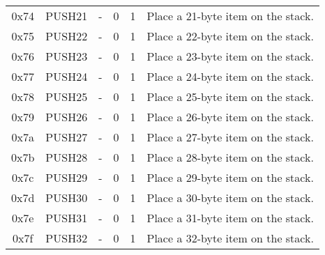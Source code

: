 \documentclass[10pt,letterpaper,leqno,bibliography=totoc]{scrartcl}
\newenvironment{alphafootnotes}
{\par\edef\savedfootnotenumber{\number\value{footnote}}
\renewcommand{\thefootnote}{\alph{footnote}}
\setcounter{footnote}{0}}
{\par\setcounter{footnote}{\savedfootnotenumber}}
\begin{document}
\begin{alphafootnotes}
\begin{longtable}{|cP{2.8cm}cccp{6cm}|}
			0x74 & PUSH21 & - & 0 & 1 & Place a 21-byte item on the stack. \\
			0x75 & PUSH22 & - & 0 & 1 & Place a 22-byte item on the stack. \\
			0x76 & PUSH23 & - & 0 & 1 & Place a 23-byte item on the stack. \\
			0x77 & PUSH24 & - & 0 & 1 & Place a 24-byte item on the stack. \\
			0x78 & PUSH25 & - & 0 & 1 & Place a 25-byte item on the stack. \\
			0x79 & PUSH26 & - & 0 & 1 & Place a 26-byte item on the stack. \\
			0x7a & PUSH27 & - & 0 & 1 & Place a 27-byte item on the stack. \\
			0x7b & PUSH28 & - & 0 & 1 & Place a 28-byte item on the stack. \\
			0x7c & PUSH29 & - & 0 & 1 & Place a 29-byte item on the stack. \\
			0x7d & PUSH30 & - & 0 & 1 & Place a 30-byte item on the stack. \\
			0x7e & PUSH31 & - & 0 & 1 & Place a 31-byte item on the stack. \\
			0x7f & PUSH32 & - & 0 & 1 & Place a 32-byte item on the stack. \\			
			\hline
			\end{longtable}


\end{alphafootnotes}
\end{document}
